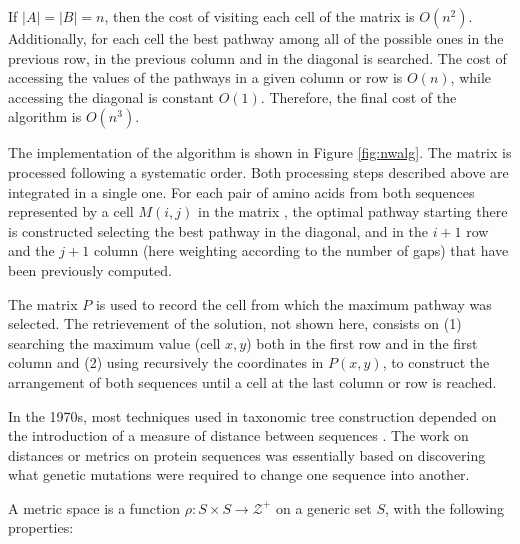 If $|A| = |B| = n$, then the cost of visiting each cell of the matrix is $O(n^2)$. Additionally, for 
each cell the best pathway among all of the possible ones in the previous row, in the previous column 
and in the diagonal is searched. The cost of accessing the values of the pathways in a given column or 
row is $O(n)$, while accessing the diagonal is constant $O(1)$. Therefore, the final cost of the 
\citeauthor{needleman:1970a} algorithm is $O(n^3)$.


The implementation of the algorithm is shown in Figure \ref{fig:nwalg}. The matrix is processed
following a systematic order. Both processing steps described above are integrated in a single 
one. For each pair of amino acids from both sequences represented by a cell $M(i,j)$ in the matrix , the 
optimal pathway starting there is constructed selecting the best pathway in the diagonal, and in the 
$i+1$ row and the $j+1$ column (here weighting according to the number of gaps) that have been 
previously computed.

The matrix $P$ is used to record the cell from which the maximum pathway was selected. The retrievement 
of the solution, not shown here, consists on (1) searching the maximum value (cell $x,y$) both in the first 
row and in the first column and (2) using recursively the coordinates in $P(x,y)$, to construct the 
arrangement of both sequences until a cell at the last column or row is reached.


\label{sellers}

 
In the 1970s, most techniques used in taxonomic tree construction depended on the introduction
of a measure of distance between sequences \citep{fitch:1967a}. The work on distances or metrics on
protein sequences was essentially based on discovering what genetic mutations were required to change
one sequence into another.

\clearpage
A metric space is a function $\rho: S \times S \rightarrow \mathcal{Z^+}$ on a generic set $S$, with 
the following properties:

\begin{center}
\end{center}


